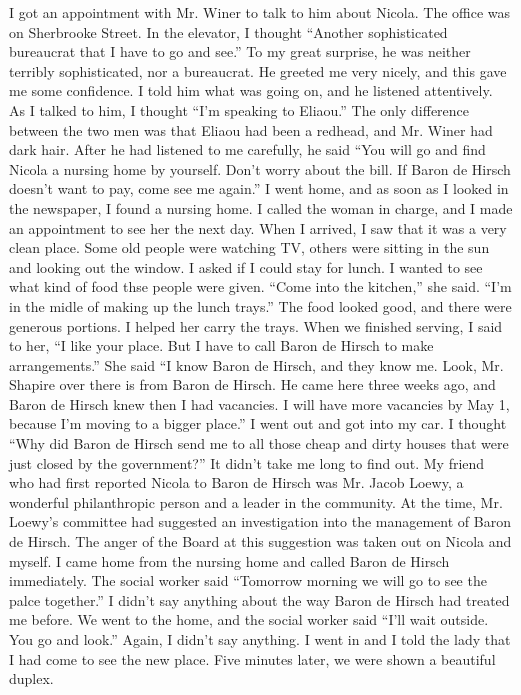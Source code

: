 I got an appointment with Mr. Winer to talk to him about Nicola. The office was on Sherbrooke Street. In the elevator, I thought “Another sophisticated bureaucrat that I have to go and see.” To my great surprise, he was neither terribly sophisticated, nor a bureaucrat. He greeted me very nicely, and this gave me some confidence. I told him what was going on, and he listened attentively. As I talked to him, I thought “I’m speaking to Eliaou.” The only difference between the two men was that Eliaou had been a redhead, and Mr. Winer had dark hair.
After he had listened to me carefully, he said “You will go and find Nicola a nursing home by yourself. Don’t worry about the bill. If Baron de Hirsch doesn’t want to pay, come see me again.”
I went home, and as soon as I looked in the newspaper, I found a nursing home. I called the woman in charge, and I made an appointment to see her the next day. When I arrived, I saw that it was a very clean place. Some old people were watching TV, others were sitting in the sun and looking out the window. I asked if I could stay for lunch. I wanted to see what kind of food thse people were given.
“Come into the kitchen,” she said. “I’m in the midle of making up the lunch trays.” The food looked good, and there were generous portions. I helped her carry the trays. When we finished serving, I said to her, “I like your place. But I have to call Baron de Hirsch to make arrangements.”
She said “I know Baron de Hirsch, and they know me. Look, Mr. Shapire over there is from Baron de Hirsch. He came here three weeks ago, and Baron de Hirsch knew then I had vacancies. I will have more vacancies by May 1, because I’m moving to a bigger place.”
I went out and got into my car. I thought “Why did Baron de Hirsch send me to all those cheap and dirty houses that were just closed by the government?” It didn’t take me long to find out.
My friend who had first reported Nicola to Baron de Hirsch was Mr. Jacob Loewy, a wonderful philanthropic person and a leader in the community. At the time, Mr. Loewy’s committee had suggested an investigation into the management of Baron de Hirsch. The anger of the Board at this suggestion was taken out on Nicola and myself.
I came home from the nursing home and called Baron de Hirsch immediately. The social worker said “Tomorrow morning we will go to see the palce together.” I didn’t say anything about the way Baron de Hirsch had treated me before.
We went to the home, and the social worker said “I’ll wait outside. You go and look.” Again, I didn’t say anything. I went in and I told the lady that I had come to see the new place. Five minutes later, we were shown a beautiful duplex.
